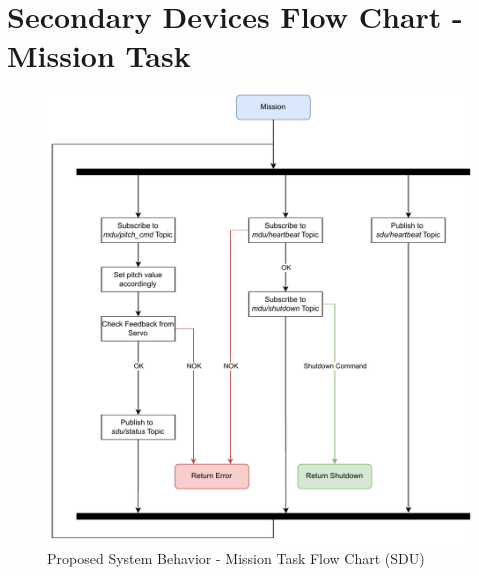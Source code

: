 
\chapter{Secondary Devices Flow Chart - Mission Task} %

\label{AppendixF}

\begin{figure}[H]
    \centering
    \includegraphics[scale=0.75]{appendices/assets/SDU_MISSION.pdf}
    \caption{Proposed System Behavior - Mission Task Flow Chart (SDU)}
    \label{fig:SDU_MISSION}
\end{figure}

